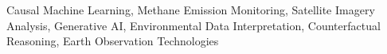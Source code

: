 \acresetall
\noindent Causal Machine Learning, Methane Emission Monitoring, Satellite Imagery Analysis, Generative AI, Environmental Data Interpretation, Counterfactual Reasoning, Earth Observation Technologies
